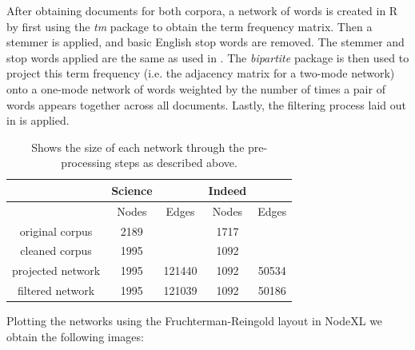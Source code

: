 \documentclass[12pt]{article}
\begin{document}
After obtaining documents for both corpora, a network of words is created in R by first using the \textit{tm} package to obtain the term frequency matrix. Then a stemmer is applied, and basic English stop words are removed. The stemmer and stop words applied are the same as used in \cite{main}. The \textit{bipartite} package is then used to project this term frequency (i.e. the adjacency matrix for a two-mode network) onto a one-mode network of words weighted by the number of times a pair of words appears together across all documents. Lastly, the filtering process laid out in \cite{mainExtra} is applied. 
\vspace{2mm}
\begin{table}[H]
\begin{center}
	\begin{tabular}{ |c|c|c||c|c|  }
		\hline
		&Science& &Indeed &\\
		\hline
		&Nodes&Edges&Nodes&Edges \\
		\hline
		original corpus& 2189& &1717 & \\
		cleaned corpus& 1995& & 1092&\\
		projected network& 1995& 121440& 1092&50534\\
		filtered network& 1995&121039 & 1092&50186\\
		\hline
	\end{tabular}
\end{center}
\caption{Shows the size of each network through the pre-processing steps as described above.}
\end{table}
\vspace{2mm}
\noindent Plotting the networks using the Fruchterman-Reingold layout in NodeXL we obtain the following images: 
\vspace{2mm}
\end{document}
